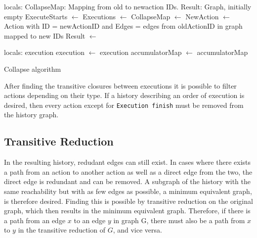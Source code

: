	\begin{algorithm}
		\begin{algorithmic}
			\State
				locals: CollapseMap: Mapping from old to newaction IDs.
				\State\hspace{28pt} Result: Graph, initially empty
				\State
				\State ExecuteStarts $\leftarrow$  \State
				Executions $\leftarrow$ 
				\State
					CollapseMap $\leftarrow$ 
				\EndFor
					\State
					NewAction $\leftarrow$ Action with \State\hspace{28pt}ID = newActionID and \State\hspace{28pt}Edges = edges from oldActionID in graph mapped to new IDs\State
					Result $\leftarrow$  \State{}
				\EndFor
				
			\EndFunction
			\State
				\State locals: execution
				 \State
					execution $\leftarrow$ 
				\EndWhile\State
				\Return execution
			\EndFunction
			\State
				\State
					accumulatorMap $\leftarrow$ 
				\EndFor \State
				\Return accumulatorMap
			\EndFunction
		\end{algorithmic}
		\caption{Collapse algorithm}
		\label{alg:collapse}
	\end{algorithm}
	
	\newpar After finding the transitive closures between executions it is possible to filter actions depending on their type. If a history describing an order of execution is desired, then every action except for \texttt{Execution finish} must be removed from the history graph. 
	
	\subsection{Transitive Reduction}
	\newpar In the resulting history, redudant edges can still exist. In cases where there exists a path from an action to another action as well as a direct edge from the two, the direct edge is redundant and can be removed.	A subgraph of the history with the same reachability but with as few edges as possible, a minimum equivalent graph, is therefore desired. Finding this is possible by transitive reduction on the original graph, which then results in the minimum equivalent graph. Therefore, if there is a path from an edge $x$ to an edge $y$ in graph G, there must also be a path from $x$ to $y$ in the transitive reduction of $G$, and vice versa. 
	
